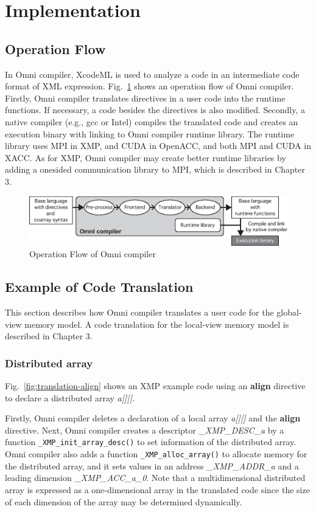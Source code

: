 \documentclass[graybox]{svmult}
\begin{document}
\section{Implementation}
\subsection{Operation Flow}
In Omni compiler,
XcodeML\cite{xcodeml} is used to analyze a code in an intermediate code format of XML expression.
Fig.~\ref{fig:xcodeml} shows an operation flow of Omni compiler.
Firstly, Omni compiler translates directives in a user code into the runtime functions. 
If necessary, a code besides the directives is also modified. 
Secondly, a native compiler (e.g., gcc or Intel) compiles the translated code and creates an execution binary with linking to Omni compiler runtime library.
The runtime library uses MPI in XMP, and CUDA in OpenACC, and both MPI and CUDA in XACC.
As for XMP, 
Omni compiler may create better runtime libraries by adding a onesided communication library to MPI, which is described in Chapter 3.
%
\begin{figure}[h]
\sidecaption
\includegraphics[scale=.6]{img/flow.eps}
\caption{Operation Flow of Omni compiler\cite{omni}} \label{fig:xcodeml}
\end{figure}
\subsection{Example of Code Translation}
This section describes how Omni compiler translates a user code for the global-view memory model.
A code translation for the local-view memory model is described in Chapter 3.

\subsubsection{Distributed array}
Fig.~\ref{fig:translation-align} shows an XMP example code using an {\bf align} directive to declare a distributed array {\it a[][]}. 

Firstly, Omni compiler deletes a declaration of a local array {\it a[][]} and the {\bf align}  directive.
Next, Omni compiler creates a descriptor {\it \_XMP\_DESC\_a} by a function {\tt \_XMP\_init\_array\_desc()} to set information of the distributed array. 
Omni compiler also adds a function {\tt \_XMP\_alloc\_array()} to allocate memory for the distributed array, and it sets values in an address {\it \_XMP\_ADDR\_a} and a leading dimension {\it \_XMP\_ACC\_a\_0}.
Note that a multidimensional distributed array is expressed as a one-dimensional array in the translated code
since the size of each dimension of the array may be determined dynamically.
\end{document}
